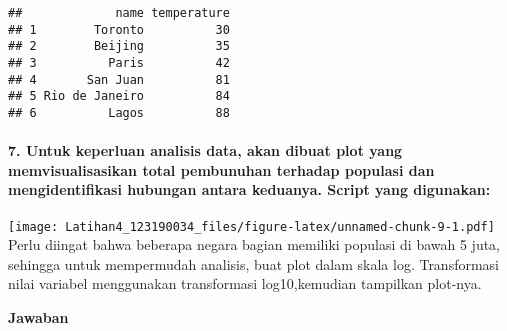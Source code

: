 \documentclass[
]{article}
\newenvironment{Shaded}{\begin{snugshade}}{\end{snugshade}}
\newcommand{\DecValTok}[1]{\textcolor[rgb]{0.00,0.00,0.81}{#1}}
\newcommand{\FunctionTok}[1]{\textcolor[rgb]{0.00,0.00,0.00}{#1}}
\newcommand{\NormalTok}[1]{#1}
\newcommand{\OtherTok}[1]{\textcolor[rgb]{0.56,0.35,0.01}{#1}}
\newcommand{\SpecialCharTok}[1]{\textcolor[rgb]{0.00,0.00,0.00}{#1}}
\begin{document}
\begin{verbatim}
##             name temperature
## 1        Toronto          30
## 2        Beijing          35
## 3          Paris          42
## 4       San Juan          81
## 5 Rio de Janeiro          84
## 6          Lagos          88
\end{verbatim}

\hypertarget{untuk-keperluan-analisis-data-akan-dibuat-plot-yang-memvisualisasikan-total-pembunuhan-terhadap-populasi-dan-mengidentifikasi-hubungan-antara-keduanya.-script-yang-digunakan}{%
\paragraph{7. Untuk keperluan analisis data, akan dibuat plot yang
memvisualisasikan total pembunuhan terhadap populasi dan
mengidentifikasi hubungan antara keduanya. Script yang
digunakan:}\label{untuk-keperluan-analisis-data-akan-dibuat-plot-yang-memvisualisasikan-total-pembunuhan-terhadap-populasi-dan-mengidentifikasi-hubungan-antara-keduanya.-script-yang-digunakan}}

\begin{Shaded}
\end{Shaded}

\texttt{[image: Latihan4\_123190034\_files/figure-latex/unnamed-chunk-9-1.pdf]}
Perlu diingat bahwa beberapa negara bagian memiliki populasi di bawah 5
juta, sehingga untuk mempermudah analisis, buat plot dalam skala log.
Transformasi nilai variabel menggunakan transformasi log10,kemudian
tampilkan plot-nya.

\textbf{Jawaban}

\begin{Shaded}
\end{Shaded}
\end{document}
